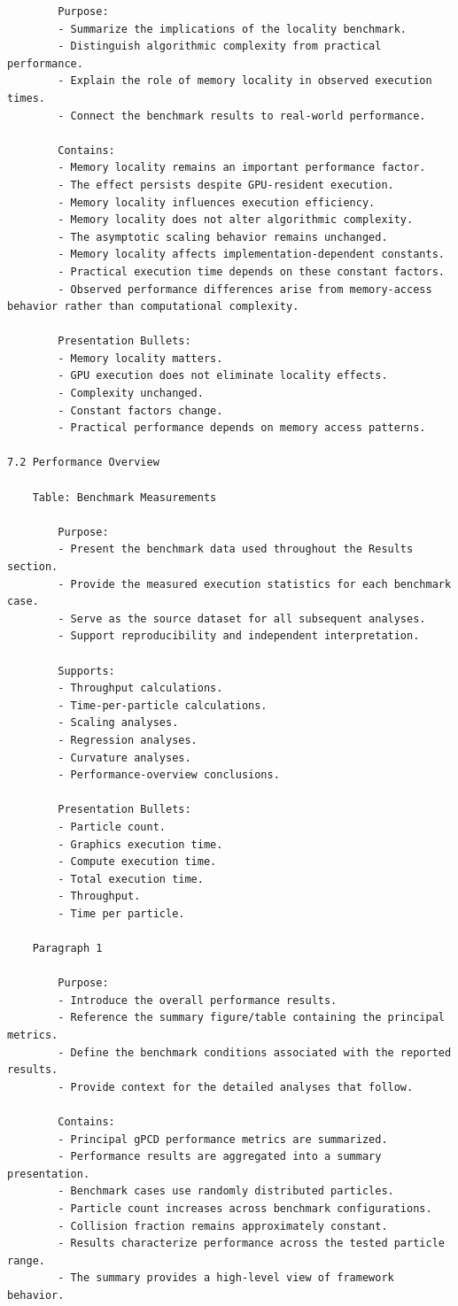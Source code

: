 \begin{verbatim}
		Purpose:
		- Summarize the implications of the locality benchmark.
		- Distinguish algorithmic complexity from practical performance.
		- Explain the role of memory locality in observed execution times.
		- Connect the benchmark results to real-world performance.

		Contains:
		- Memory locality remains an important performance factor.
		- The effect persists despite GPU-resident execution.
		- Memory locality influences execution efficiency.
		- Memory locality does not alter algorithmic complexity.
		- The asymptotic scaling behavior remains unchanged.
		- Memory locality affects implementation-dependent constants.
		- Practical execution time depends on these constant factors.
		- Observed performance differences arise from memory-access behavior rather than computational complexity.

		Presentation Bullets:
		- Memory locality matters.
		- GPU execution does not eliminate locality effects.
		- Complexity unchanged.
		- Constant factors change.
		- Practical performance depends on memory access patterns.

7.2 Performance Overview

	Table: Benchmark Measurements

		Purpose:
		- Present the benchmark data used throughout the Results section.
		- Provide the measured execution statistics for each benchmark case.
		- Serve as the source dataset for all subsequent analyses.
		- Support reproducibility and independent interpretation.

		Supports:
		- Throughput calculations.
		- Time-per-particle calculations.
		- Scaling analyses.
		- Regression analyses.
		- Curvature analyses.
		- Performance-overview conclusions.

		Presentation Bullets:
		- Particle count.
		- Graphics execution time.
		- Compute execution time.
		- Total execution time.
		- Throughput.
		- Time per particle.

	Paragraph 1

		Purpose:
		- Introduce the overall performance results.
		- Reference the summary figure/table containing the principal metrics.
		- Define the benchmark conditions associated with the reported results.
		- Provide context for the detailed analyses that follow.

		Contains:
		- Principal gPCD performance metrics are summarized.
		- Performance results are aggregated into a summary presentation.
		- Benchmark cases use randomly distributed particles.
		- Particle count increases across benchmark configurations.
		- Collision fraction remains approximately constant.
		- Results characterize performance across the tested particle range.
		- The summary provides a high-level view of framework behavior.


\end{verbatim}

